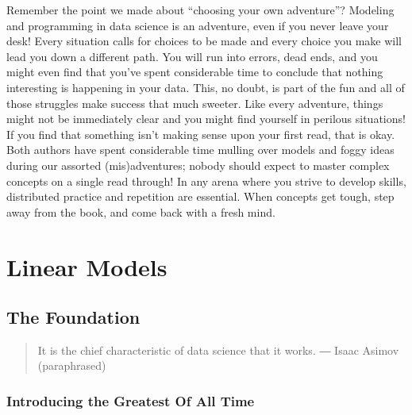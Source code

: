 \documentclass[
  letterpaper,
]{krantz}
\begin{document}

Remember the point we made about ``choosing your own adventure''?
Modeling and programming in data science is an adventure, even if you
never leave your desk! Every situation calls for choices to be made and
every choice you make will lead you down a different path. You will run
into errors, dead ends, and you might even find that you've spent
considerable time to conclude that nothing interesting is happening in
your data. This, no doubt, is part of the fun and all of those struggles
make success that much sweeter. Like every adventure, things might not
be immediately clear and you might find yourself in perilous situations!
If you find that something isn't making sense upon your first read, that
is okay. Both authors have spent considerable time mulling over models
and foggy ideas during our assorted (mis)adventures; nobody should
expect to master complex concepts on a single read through! In any arena
where you strive to develop skills, distributed practice and repetition
are essential. When concepts get tough, step away from the book, and
come back with a fresh mind.

\part{Linear Models}

\chapter{The Foundation}\label{sec-foundation}

\begin{quote}
It is the chief characteristic of data science that it works. ― Isaac
Asimov (paraphrased)
\end{quote}

\section{Introducing the Greatest Of All Time}\label{sec-goat}
\end{document}

